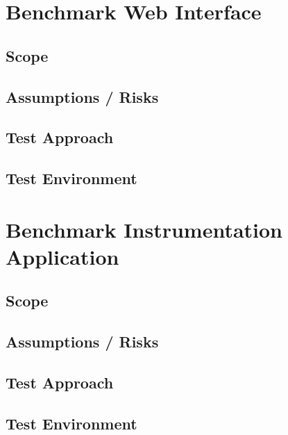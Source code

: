 \documentclass[11pt,a4paper]{article}
\begin{document}
\section{Benchmark Web Interface}
\subsection{Scope}
\subsection{Assumptions / Risks}
\subsection{Test Approach}
\subsection{Test Environment}

\section{Benchmark Instrumentation Application}
\subsection{Scope}
\subsection{Assumptions / Risks}
\subsection{Test Approach}
\subsection{Test Environment}
\end{document}
